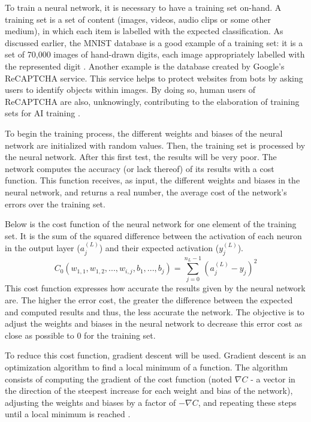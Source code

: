 \documentclass[12pt,a4paper,notitlepage]{article}
\begin{document}
To train a neural network, it is necessary to have a training set on-hand. A training set is a set of content (images, videos, audio clips or some other medium), in which each item is labelled with the expected classification. As discussed earlier, the MNIST database is a good example of a training set: it is a set of 70,000 images of hand-drawn digits, each image appropriately labelled with the represented digit \cite{lecun_mnist_1998}. Another example is the database created by Google's ReCAPTCHA service. This service helps to protect websites from bots by asking users to identify objects within images. By doing so, human users of ReCAPTCHA are also, unknowingly, contributing to the elaboration of training sets for AI training \cite{maruzani_are_2021}.

To begin the training process, the different weights and biases of the neural network are initialized with random values. Then, the training set is processed by the neural network. After this first test, the results will be very poor. The network computes the accuracy (or lack thereof) of its results with a cost function. This function receives, as input, the different weights and biases in the neural network, and returns a real number, the average cost of the network's errors over the training set.

Below is the cost function of the neural network for one element of the training set. It is the sum of the squared difference between the activation of each neuron in the output layer (\(a_{j}^{(L)}\)) and their expected activation (\(y_{j}^{(L)}\)).
\begin{displaymath}
	C_{0}(w_{1,1}, w_{1,2}, ..., w_{i,j}, b_{1}, ... ,b_{j}) = \sum_{j=0}^{n_{L} - 1} (a_{j}^{(L)} - y_{j})^{2}
\end{displaymath}
This cost function expresses how accurate the results given by the neural network are. The higher the error cost, the greater the difference between the expected and computed results and thus, the less accurate the network. The objective is to adjust the weights and biases in the neural network to decrease this error cost as close as possible to 0 for the training set.

To reduce this cost function, gradient descent will be used. Gradient descent is an optimization algorithm to find a local minimum of a function. The algorithm consists of computing the gradient of the cost function (noted \(\nabla C\) - a vector in the direction of the steepest increase for each weight and bias of the network), adjusting the weights and biases by a factor of \(-\nabla C\), and repeating these steps until a local minimum is reached \cite{sanderson_gradient_2017}.
\end{document}
